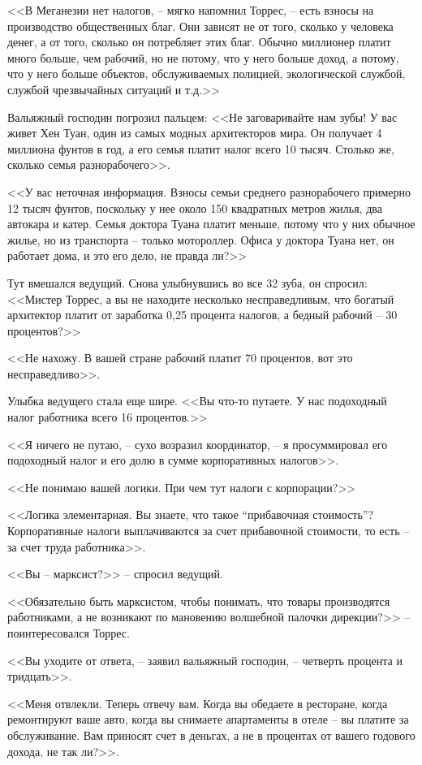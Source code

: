 <<В Меганезии нет налогов, -- мягко напомнил Торрес, -- есть взносы на производство общественных благ. Они зависят не от того, сколько у человека денег, а от того, сколько он потребляет этих благ. Обычно миллионер платит много больше, чем рабочий, но не потому, что у него больше доход, а потому, что у него больше объектов, обслуживаемых полицией, экологической службой, службой чрезвычайных ситуаций и т.д.>>

Вальяжный господин погрозил пальцем: <<Не заговаривайте нам зубы! У вас живет Хен Туан, один из самых модных архитекторов мира. Он получает 4 миллиона фунтов в год, а его семья платит налог всего 10 тысяч. Столько же, сколько семья разнорабочего>>.

<<У вас неточная информация. Взносы семьи среднего разнорабочего примерно 12 тысяч фунтов, поскольку у нее около 150 квадратных метров жилья, два автокара и катер. Семья доктора Туана платит меньше, потому что у них обычное жилье, но из транспорта -- только мотороллер. Офиса у доктора Туана нет, он работает дома, и это его дело, не правда ли?>>

Тут вмешался ведущий. Снова улыбнувшись во все 32 зуба, он спросил: <<Мистер Торрес, а вы не находите несколько несправедливым, что богатый архитектор платит от заработка 0,25 процента налогов, а бедный рабочий -- 30 процентов?>>

<<Не нахожу. В вашей стране рабочий платит 70 процентов, вот это несправедливо>>.

Улыбка ведущего стала еще шире. <<Вы что-то путаете. У нас подоходный налог работника всего 16 процентов.>>

<<Я ничего не путаю, -- сухо возразил координатор, -- я просуммировал его подоходный налог и его долю в сумме корпоративных налогов>>.

<<Не понимаю вашей логики. При чем тут налоги с корпорации?>>

<<Логика элементарная. Вы знаете, что такое ``прибавочная стоимость''? Корпоративные налоги выплачиваются за счет прибавочной стоимости, то есть -- за счет труда работника>>.

<<Вы -- марксист?>> -- спросил ведущий.

<<Обязательно быть марксистом, чтобы понимать, что товары производятся работниками, а не возникают по мановению волшебной палочки дирекции?>> -- поинтересовался Торрес.

<<Вы уходите от ответа, -- заявил вальяжный господин, -- четверть процента и тридцать>>.

<<Меня отвлекли. Теперь отвечу вам. Когда вы обедаете в ресторане, когда ремонтируют ваше авто, когда вы снимаете апартаменты в отеле -- вы платите за обслуживание. Вам приносят счет в деньгах, а не в процентах от вашего годового дохода, не так ли?>>.


